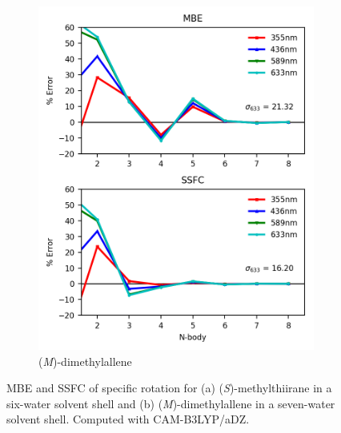 \begin{figure}
\begin{subfigure}{0.5\textwidth}
                \includegraphics[scale=0.75]{p1/graphs/dma_7_cam_rot.png}
                \caption{(\textit{M})-dimethylallene}
                \label{dma_7_rot_cam}
            \end{subfigure}
            \caption{MBE and SSFC of specific rotation for (a) (\textit{S})-methylthiirane in a six-water solvent shell and (b) (\textit{M})-dimethylallene in a seven-water solvent shell. Computed with CAM-B3LYP/aDZ.}
            \label{metthi_dma_cam}
        \end{figure}

